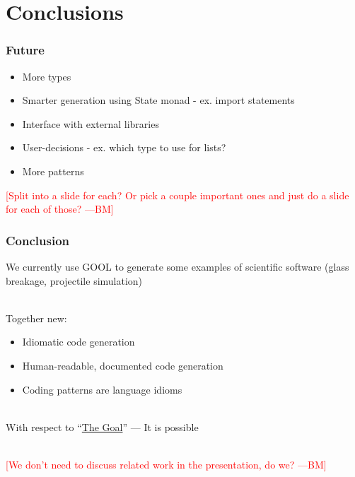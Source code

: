\documentclass{beamer}
\newcommand{\authornote}[3]{\textcolor{#1}{[#3 ---#2]}}
\newcommand{\bmac}[1]{\authornote{red}{BM}{#1}}
\begin{document}

\section[Conclusions]{Conclusions}


\begin{frame}

\frametitle{Future}

\begin{itemize}
	\item More types
	\item Smarter generation using State monad - ex. import statements
	\item Interface with external libraries
	\item User-decisions - ex. which type to use for lists?
	\item More patterns
\end{itemize}

\bmac{Split into a slide for each? Or pick a couple important ones and just do 
a slide for each of those?}

\end{frame}


\begin{frame}

\frametitle{Conclusion}

We currently use GOOL to generate some examples of scientific software (glass 
breakage, projectile simulation)\\~\

Together new:
\begin{itemize}
	\item Idiomatic code generation
	\item Human-readable, documented code generation
	\item Coding patterns are language idioms\\~\
\end{itemize}

With respect to ``\hyperref[goal]{The Goal}'' --- It is possible\\~\

\bmac{We don't need to discuss related work in the presentation, do we?}

\end{frame}
\end{document}
